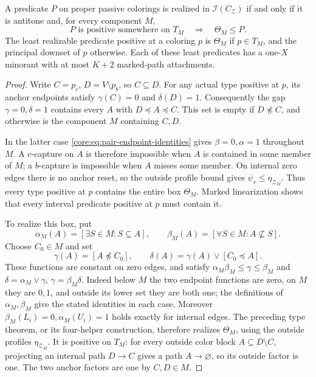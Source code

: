 \begin{theorem}
\label{core:thm:pair-source-interval}
A predicate $P$ on proper passive colorings is realized in
$\mathcal I(C_{\mathcal Z})$ if and only if it is antitone and,
for every component $M$,
\[
 P\text{ is positive somewhere on }T_M
 \quad\Longrightarrow\quad \Theta_M\leq P.
\]
The least realizable predicate positive at a coloring $p$ is
$\Theta_M$ if $p\in T_M$, and the principal downset of $p$ otherwise.
Each of these least predicates has a one-$X$ minorant with at most
$K+2$ marked-path attachments.
\end{theorem}
\begin{proof}
Write $C=p_c$, $D=V\setminus p_b$, so $C\subseteq D$.
For any actual type positive at $p$, its anchor endpoints satisfy
$\gamma(C)=0$ and $\delta(D)=1$.
Consequently the gap $\gamma=0,\delta=1$ contains every $A$ with
$D\preceq A\preceq C$. This set is empty if $D\npreceq C$,
and otherwise is the component $M$ containing $C,D$.

In the latter case \eqref{core:eq:pair-endpoint-identities} gives
$\beta=0,\alpha=1$ throughout $M$.
A $c$-capture on $A$ is therefore impossible when $A$ is contained
in some member of $M$; a $b$-capture is impossible when $A$ misses
some member. On internal zero edges there is no anchor reset, so the
outside profile bound gives $\psi_r\leq\eta_{\mathcal Z_M}$.
Thus every type positive at $p$ contains the entire box $\Theta_M$.
Marked linearization shows that every interval predicate positive at
$p$ must contain it.

To realize this box, put
\[
 \alpha_M(A)=[\exists S\in M:S\subseteq A],\qquad
 \beta_M(A)=[\forall S\in M:A\nsubseteq S].
\]
Choose $C_0\in M$ and set
\[
 \gamma(A)=[A\npreceq C_0],\qquad
 \delta(A)=\gamma(A)\lor[C_0\preceq A].
\]
These functions are constant on zero edges, and satisfy
$\alpha_M\beta_M\leq\gamma\leq\beta_M$ and
$\delta=\alpha_M\lor\gamma$, $\gamma=\beta_M\delta$.
Indeed below $M$ the two endpoint functions are zero, on $M$ they
are $0,1$, and outside its lower set they are both one; the definitions
of $\alpha_M,\beta_M$ give the stated identities in each case.
Moreover $\beta_M(L_i)=0,\alpha_M(U_i)=1$ holds exactly for internal
edges. The preceding type theorem, or its four-helper construction,
therefore realizes $\Theta_M$, using the outside profiles
$\eta_{\mathcal Z_M}$.
It is positive on $T_M$: for every outside color block
$A\subseteq D\setminus C$, projecting an internal path $D\to C$
gives a path $A\to\varnothing$, so its outside factor is one.
The two anchor factors are one by $C,D\in M$.


\end{proof}
